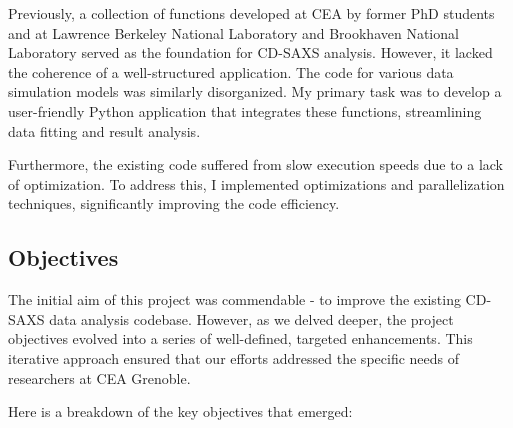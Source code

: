 \medskip

Previously, a collection of functions developed at CEA by former PhD students and at Lawrence Berkeley National Laboratory and Brookhaven National Laboratory served as the 
foundation for CD-SAXS analysis. However, it lacked the coherence of a well-structured application.
The code for various data simulation models was similarly disorganized. My primary task was to 
develop a user-friendly Python application that integrates these functions, streamlining data 
fitting and result analysis.

\medskip

Furthermore, the existing code suffered from slow execution speeds due to a lack of optimization.
To address this, I implemented optimizations and parallelization techniques, significantly 
improving the code efficiency.

\medskip


\subsection{Objectives}

\medskip

The initial aim of this project was commendable - to improve the existing CD-SAXS data analysis 
codebase. However, as we delved deeper, the project objectives evolved into a series of 
well-defined, targeted enhancements. This iterative approach ensured that our efforts addressed 
the specific needs of researchers at CEA Grenoble.

Here is a breakdown of the key objectives that emerged:

